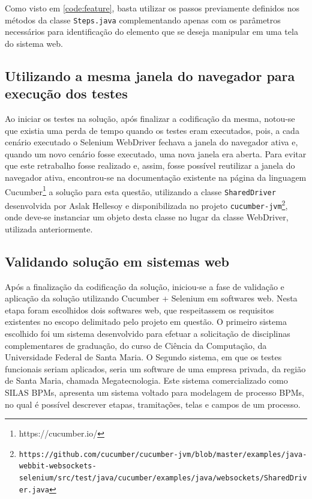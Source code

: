 \documentclass[tg]{mdtufsm}
\begin{document}
Como visto em \ref{code:feature}, basta utilizar os passos previamente definidos nos métodos da classe \texttt{Steps.java} complementando apenas com os parâmetros necessários para identificação do elemento que se deseja manipular em uma tela do sistema web.

\subsection{Utilizando a mesma janela do navegador para execução dos testes}
Ao iniciar os testes na solução, após finalizar a codificação da mesma, notou-se que existia uma perda de tempo quando os testes eram executados, pois, a cada cenário executado o Selenium WebDriver fechava a janela do navegador ativa e, quando um novo cenário fosse executado, uma nova janela era aberta. Para evitar que este retrabalho fosse realizado e, assim, fosse possível reutilizar a janela do navegador ativa, encontrou-se na documentação existente na página da linguagem Cucumber\footnote{https://cucumber.io/} a solução para esta questão, utilizando a classe \texttt{SharedDriver} desenvolvida por Aslak Hellesoy e disponibilizada no projeto \texttt{cucumber-jvm\footnote{https://github.com/cucumber/cucumber-jvm/blob/master/examples/java-webbit-websockets-selenium/src/test/java/cucumber/examples/java/websockets/SharedDriver.java}}, onde deve-se instanciar um objeto desta classe no lugar da classe WebDriver, utilizada anteriormente.

\subsection{Validando solução em sistemas web}
Após a finalização da codificação da solução, iniciou-se a fase de validação e aplicação da solução utilizando Cucumber + Selenium em softwares web. Nesta etapa foram escolhidos dois softwares web, que respeitassem os requisitos existentes no escopo delimitado pelo projeto em questão. O primeiro sistema escolhido foi um sistema desenvolvido para efetuar a solicitação de disciplinas complementares de graduação, do curso de Ciência da Computação, da Universidade Federal de Santa Maria. O Segundo sistema, em que os testes funcionais seriam aplicados, seria um software de uma empresa privada, da região de Santa Maria, chamada Megatecnologia. Este sistema comercializado como SILAS BPMs, apresenta
um sistema voltado para modelagem de processo BPMs, no qual é possível descrever etapas, tramitações, telas e campos de um processo.
\end{document}
